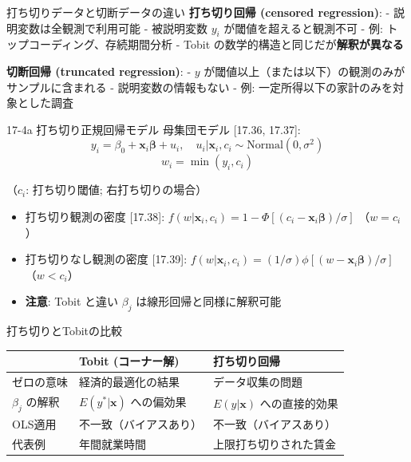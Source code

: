 \documentclass[
  ignorenonframetext,
]{beamer}
\providecommand{\tightlist}{%
  \setlength{\itemsep}{0pt}\setlength{\parskip}{0pt}}
\begin{document}
\begin{frame}{打ち切りデータと切断データの違い}
\protect\hypertarget{ux6253ux3061ux5207ux308aux30c7ux30fcux30bfux3068ux5207ux65adux30c7ux30fcux30bfux306eux9055ux3044}{}
\textbf{打ち切り回帰 (censored regression)}: -
説明変数は全観測で利用可能 - 被説明変数 \(y_i\) が閾値を超えると観測不可
- 例: トップコーディング、存続期間分析 - Tobit
の数学的構造と同じだが\textbf{解釈が異なる}

\textbf{切断回帰 (truncated regression)}: - \(y\)
が閾値以上（または以下）の観測のみがサンプルに含まれる -
説明変数の情報もない - 例: 一定所得以下の家計のみを対象とした調査
\end{frame}

\begin{frame}{17-4a 打ち切り正規回帰モデル}
\protect\hypertarget{a-ux6253ux3061ux5207ux308aux6b63ux898fux56deux5e30ux30e2ux30c7ux30eb}{}
母集団モデル {[}17.36, 17.37{]}:
\[y_i = \beta_0 + \mathbf{x}_i\boldsymbol{\beta} + u_i, \quad u_i|\mathbf{x}_i, c_i \sim \text{Normal}(0, \sigma^2)\]
\[w_i = \min(y_i, c_i)\]

（\(c_i\): 打ち切り閾値; 右打ち切りの場合）

\begin{itemize}
\tightlist
\item
  打ち切り観測の密度 {[}17.38{]}:
  \(f(w|\mathbf{x}_i, c_i) = 1 - \Phi[(c_i - \mathbf{x}_i\boldsymbol{\beta})/\sigma]\)
  （\(w = c_i\)）
\item
  打ち切りなし観測の密度 {[}17.39{]}:
  \(f(w|\mathbf{x}_i, c_i) = (1/\sigma)\phi[(w - \mathbf{x}_i\boldsymbol{\beta})/\sigma]\)
  （\(w < c_i\)）
\item
  \textbf{注意}: Tobit と違い \(\beta_j\) は線形回帰と同様に解釈可能
\end{itemize}
\end{frame}

\begin{frame}{打ち切りとTobitの比較}
\protect\hypertarget{ux6253ux3061ux5207ux308aux3068tobitux306eux6bd4ux8f03}{}
\begin{longtable}[]{@{}lll@{}}
\toprule
& Tobit (コーナー解) & 打ち切り回帰 \\
\midrule
\endhead
ゼロの意味 & 経済的最適化の結果 & データ収集の問題 \\
\(\beta_j\) の解釈 & \(E(y^*|\mathbf{x})\) への偏効果 &
\(E(y|\mathbf{x})\) への直接的効果 \\
OLS適用 & 不一致（バイアスあり） & 不一致（バイアスあり） \\
代表例 & 年間就業時間 & 上限打ち切りされた賃金 \\
\bottomrule
\end{longtable}
\end{frame}
\end{document}
